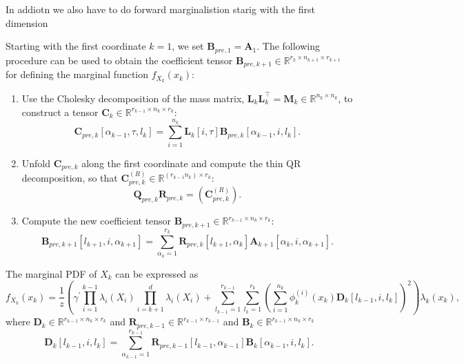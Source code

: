 In addiotn we also have to  do forward marginalistion starig with the first dimension
\begin{prop}
	Starting with the first coordinate $k = 1$, we set $\bm{B}_{pre,1} = \bm{A}_1$. The following procedure can be used to obtain the coefficient tensor $\bm{B}_{pre,k+1} \in \mathbb{R}^{r_{k} \times n_{k+1} \times r_{k+1}}$ for defining the marginal function $f_{X_k}(x_k)$:
	\begin{enumerate}
		\item Use the Cholesky decomposition of the mass matrix, $\bm{L}_k \bm{L}_k^\top = \bm{M}_k \in \mathbb{R}^{n_k \times n_k}$, to construct a tensor $\bm{C}_k \in \mathbb{R}^{r_{k-1} \times n_k \times r_k}$:
		\begin{equation}
			\bm{C}_{pre,k}[\alpha_{k-1}, \tau, l_k] = \sum_{i=1}^{n_k} \bm{L}_k[i, \tau] \bm{B}_{pre,k}[\alpha_{k-1}, i, l_k] .
		\end{equation}
		\item Unfold $\bm{C}_{pre,k}$ along the first coordinate and compute the thin QR decomposition, so that $\bm{C}_{pre,k}^{(R)} \in \mathbb{R}^{(r_{k-1} n_k ) \times r_k}$:
		\begin{equation}
			\bm{Q}_{pre,k}\bm{R}_{pre,k} = {(\bm{C}_{pre,k}^{(R)})}.
		\end{equation}
		\item Compute the new coefficient tensor $\bm{B}_{pre, k+1} \in \mathbb{R}^{r_{k-1} \times n_k \times r_k} $:
		\begin{equation}
			\bm{B}_{pre, k+1}[l_{k+1}, i, \alpha_{k+1}] = \sum_{\alpha_{k}=1}^{r_{k}} \bm{R}_{pre,k}[l_{k+1}, \alpha_{k}] \bm{A}_{k+1}[\alpha_{k}, i, \alpha_{k+1}] .
		\end{equation}
	\end{enumerate}
\end{prop}



The marginal PDF of $X_{k}$ can be expressed as
\begin{equation}
	f_{X_k}(x_k) = \frac{1}{z} \left(\gamma^{\prime} \prod_{i=1}^{k-1} \lambda_i(X_i) \prod_{i=k+1}^{d} \lambda_i(X_i) + \sum_{l_{k-1}=1}^{r_{k-1}} \sum_{l_k=1}^{r_k} \left(\sum_{i=1}^{n_k} \phi^{(i)}_k(x_k) \bm{D}_k[l_{k-1},i, l_k] \right)^2 \right) \lambda_k(x_k),
\end{equation}
where $\bm{D}_k \in \mathbb{R}^{r_{k-1} \times n_k \times r_k}$ and $\bm{R}_{pre,k-1}\in \mathbb{R}^{r_{k-1} \times r_{k-1}}$ and $\bm{B}_k \in \mathbb{R}^{r_{k-1} \times n_k \times r_k}$
\begin{equation}
	\bm{D}_k[l_{k-1},i,l_k] = \sum_{\alpha_{k-1}=1}^{r_{k-1}}  \bm{R}_{pre,k-1}[l_{k-1}, \alpha_{k-1}] \bm{B}_k[\alpha_{k-1}, i, l_k].
\end{equation}
